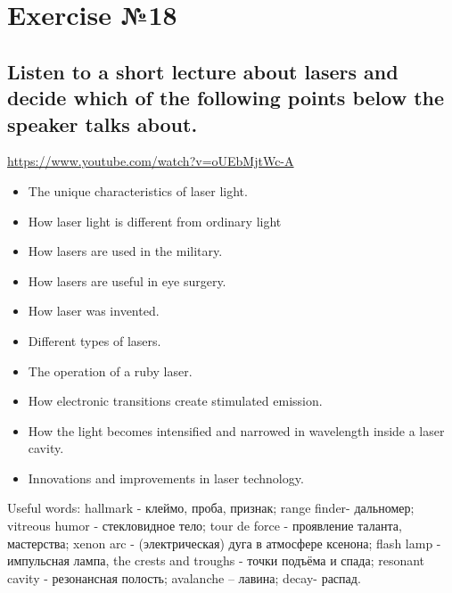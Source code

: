 \section*{Exercise №18}
\subsection*{Listen to a short lecture about lasers and decide which of the following points below the
      speaker talks about.}

\href{https://www.youtube.com/watch?v=oUEbMjtWc-A}{https://www.youtube.com/watch?v=oUEbMjtWc-A}

\begin{itemize}
      \item The unique characteristics of laser light.
      \item How laser light is different from ordinary light
      \item How lasers are used in the military.
      \item How lasers are useful in eye surgery.
      \item How laser was invented.
      \item Different types of lasers.
      \item The operation of a ruby laser.
      \item How electronic transitions create stimulated emission.
      \item How the light becomes intensified and narrowed in wavelength inside a laser cavity.
      \item Innovations and improvements in laser technology.
\end{itemize}

Useful words: hallmark - клеймо, проба, признак; range finder- дальномер; vitreous humor -
стекловидное тело; tour de force - проявление таланта, мастерства; xenon arc -
(электрическая) дуга в атмосфере ксенона; flash lamp - импульсная лампа, the crests and
troughs - точки подъёма и спада; resonant cavity - резонансная полость; avalanche – лавина;
decay- распад.

